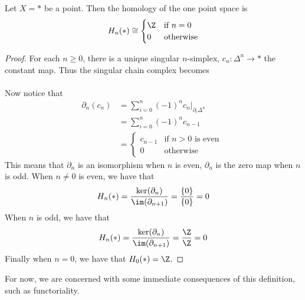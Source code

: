 \documentclass[a4paper]{article}
\begin{document}
\begin{eg}{}{} Let $X=\ast$ be a point. Then the homology of the one point space is $$H_n(\ast)\cong\begin{cases}
\Z & \text{if } n=0\\
0 & \text{otherwise}
\end{cases}$$ 
\begin{proof}
For each $n\geq 0$, there is a unique singular $n$-simplex, $c_n:\Delta^n\to\ast$ the constant map. Thus the singular chain complex becomes \\
\\
Now notice that 
\begin{align*}
\partial_n(c_n)&=\sum_{i=0}^n(-1)^nc_n|_{\partial_i\Delta^n}\\
&=\sum_{i=0}^n(-1)^nc_{n-1}\\
&=\begin{cases}
c_{n-1} & \text{if } n>0\text{ is even }\\
0 & \text{otherwise }
\end{cases}
\end{align*}
This means that $\partial_n$ is an isomorphism when $n$ is even, $\partial_n$ is the zero map when $n$ is odd. When $n\neq 0$ is even, we have that $$H_n(\ast)=\frac{\ker(\partial_n)}{\im(\partial_{n+1})}=\frac{\{0\}}{\{0\}}=0$$ When $n$ is odd, we have that $$H_n(\ast)=\frac{\ker(\partial_n)}{\im(\partial_{n+1})}=\frac{\Z}{\Z}=0$$ Finally when $n=0$, we have that $H_0(\ast)=\Z$. 
\end{proof}
\end{eg}

For now, we are concerned with some immediate consequences of this definition, such as functoriality. 
\end{document}
